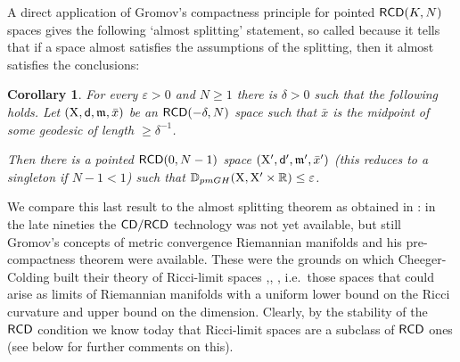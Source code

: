 \documentclass[11pt]{article}
\numberwithin{equation}{section}
\newtheorem{corollary}[theorem]{Corollary}
\newcommand{\R}{\mathbb{R}}
\newcommand{\X}{{\rm X}}
\newcommand{\sfd}{{\sf d}}
\newcommand{\mm}{{\mathfrak m}}
\newcommand{\CD}{{\sf CD}}
\newcommand{\RCD}{{\sf RCD}}
\newcommand{\eps}{\varepsilon}
\begin{document}
A direct application of Gromov's compactness principle for pointed $\RCD(K,N)$ spaces gives the following `almost splitting' statement, so called because it tells that if a space almost satisfies the assumptions of the splitting, then it almost satisfies the conclusions:
\begin{corollary}\label{cor:almostspl}
For every $\eps>0$ and $N\geq 1$ there is $\delta>0$ such that the following holds. Let $(\X,\sfd,\mm,\bar x)$ be an $\RCD(-\delta,N)$ space such that $\bar x$ is the midpoint of some geodesic of length $\geq \delta^{-1}$.

Then there is a pointed $\RCD(0,N-1)$ space $(\X',\sfd',\mm',\bar x')$ (this  reduces to a singleton if $N-1<1$) such that $\mathbb D_{pmGH}(\X,\X'\times\R)\leq \eps$.
\end{corollary} 
We compare this last result to the almost splitting theorem as obtained in \cite{Cheeger-Colding96}: in the late nineties the  $\CD/\RCD$ technology was not yet available, but still Gromov's concepts of metric convergence Riemannian manifolds and his pre-compactness theorem were available. These were the grounds on which Cheeger-Colding built their theory of Ricci-limit spaces \cite{Cheeger-Colding97I} ,\cite{Cheeger-Colding97II}, \cite{Cheeger-Colding97III}, i.e.\ those spaces that could arise as limits of Riemannian manifolds with a uniform lower bound on the Ricci curvature and upper bound on the dimension. Clearly, by the stability of the $\RCD$ condition we know today that Ricci-limit spaces are a subclass of $\RCD$ ones (see below for further comments on this).
\end{document}
